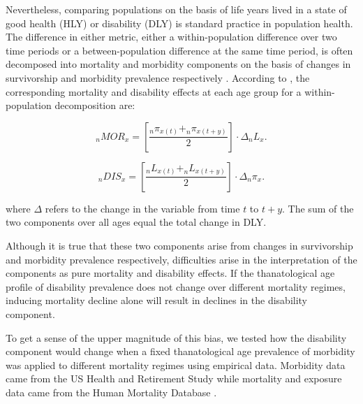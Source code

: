 \documentclass[11pt,oneside,a4paper]{article} %
\begin{document}
Nevertheless, comparing populations on the basis of life years lived in a state of good health (HLY) or disability (DLY) is standard practice in population health. The difference in either metric, either a within-population difference over two time periods or a between-population difference at the same time period, is often decomposed into mortality and morbidity components on the basis of changes in survivorship and morbidity prevalence respectively \citep{Nusselder2004,Andreev2002}. According to \citet{Nusselder2004}, the corresponding mortality and disability effects at each age group for a within-population decomposition are:

\begin{equation}\label{eq:MORcomp}
	{_{n}{MOR}_{x}}=\left [ \frac{_{n}\pi_{x\left ( t \right )} + _{n}\pi_{x\left ( t+y \right )}  }{2}\right ]\cdot \Delta _{n}L_{x}.
\end{equation}

\begin{equation}\label{eq:DIScomp}
	{_{n}{DIS}_{x}}=\left [ \frac{_{n}L_{x\left ( t \right )} + _{n}L_{x\left ( t+y \right )}  }{2}\right ]\cdot \Delta _{n}\pi_{x}.	
\end{equation}

where $\Delta$ refers to the change in the variable from time $t$ to $t+y$. The sum of the two components over all ages equal the total change in DLY.

Although it is true that these two components arise from changes in survivorship and morbidity prevalence respectively, difficulties arise in the interpretation of the components as pure mortality and disability effects. If the thanatological age profile of disability prevalence does not change over different mortality regimes, inducing mortality decline alone will result in declines in the disability component.

To get a sense of the upper magnitude of this bias, we tested how the disability component would change when a fixed thanatological age prevalence of morbidity was applied to different mortality regimes using empirical data. Morbidity data came from the US Health and Retirement Study while mortality and exposure data came from the Human Mortality Database \citep{HMD2015}.
\end{document}
